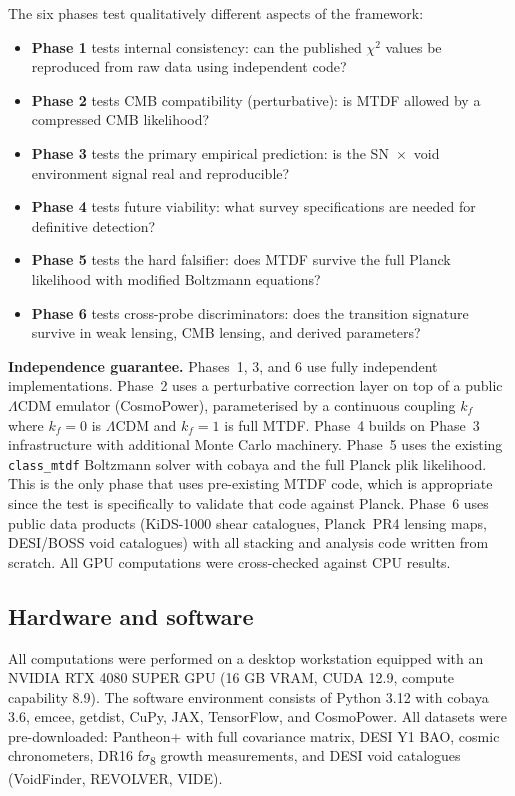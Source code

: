 \documentclass[11pt,a4paper]{article}
\begin{document}
The six phases test qualitatively different aspects of the framework:

\begin{itemize}
  \item \textbf{Phase 1} tests internal consistency: can the published $\chi$$^{2}$ values be reproduced from raw data using independent code?
  \item \textbf{Phase 2} tests CMB compatibility (perturbative): is MTDF allowed by a compressed CMB likelihood?
  \item \textbf{Phase 3} tests the primary empirical prediction: is the SN~$\times$~void environment signal real and reproducible?
  \item \textbf{Phase 4} tests future viability: what survey specifications are needed for definitive detection?
  \item \textbf{Phase 5} tests the hard falsifier: does MTDF survive the full Planck likelihood with modified Boltzmann equations?
  \item \textbf{Phase 6} tests cross-probe discriminators: does the transition signature survive in weak lensing, CMB lensing, and derived parameters?
\end{itemize}

\begin{mdframed}[linecolor=accent,linewidth=0.5pt,backgroundcolor=callout-bg,leftline=true,rightline=true,topline=true,bottomline=true,innerleftmargin=8pt,innerrightmargin=8pt,innertopmargin=6pt,innerbottommargin=6pt]
\textbf{Independence guarantee.}
Phases~1, 3, and 6 use fully independent implementations. Phase~2 uses a perturbative correction layer on top of a public $\Lambda$CDM emulator (CosmoPower), parameterised by a continuous coupling \( k_f \) where \( k_f = 0 \) is $\Lambda$CDM and \( k_f = 1 \) is full MTDF. Phase~4 builds on Phase~3 infrastructure with additional Monte Carlo machinery. Phase~5 uses the existing \texttt{class\_\allowbreak{}mtdf} Boltzmann solver with cobaya and the full Planck plik likelihood. This is the only phase that uses pre-existing MTDF code, which is appropriate since the test is specifically to validate that code against Planck. Phase~6 uses public data products (KiDS-1000 shear catalogues, Planck~PR4 lensing maps, DESI/\allowbreak{}BOSS void catalogues) with all stacking and analysis code written from scratch. All GPU computations were cross-checked against CPU results.
\end{mdframed}

\subsection{Hardware and software}
All computations were performed on a desktop workstation equipped with an NVIDIA RTX 4080 SUPER GPU (16 GB VRAM, CUDA 12.9, compute capability 8.9). The software environment consists of Python 3.12 with cobaya 3.6, emcee, getdist, CuPy, JAX, TensorFlow, and CosmoPower. All datasets were pre-downloaded: Pantheon+ with full covariance matrix, DESI Y1 BAO, cosmic chronometers, DR16 f$\sigma$\textsubscript{8} growth measurements, and DESI void catalogues (VoidFinder, REVOLVER, VIDE).
\end{document}
